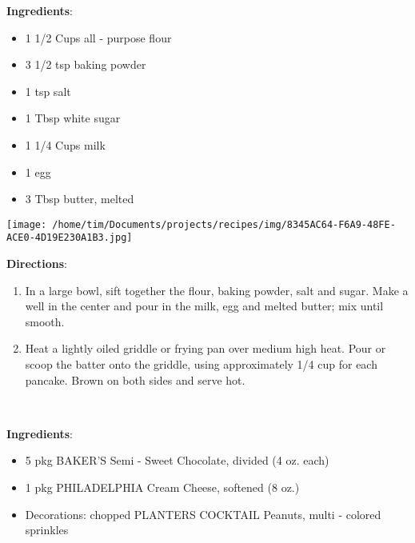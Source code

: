\documentclass[11pt, twoside, openany]{book}
\begin{document}
\begin{minipage}[t]{0.8\linewidth}
\textbf{Ingredients}:\vspace{-3mm}
\begin{multicols}{2}
\begin{itemize}\setlength\itemsep{-1mm}
\item 1 1/2 Cups all - purpose flour
\item 3 1/2 tsp baking powder
\item 1 tsp salt
\item 1 Tbsp white sugar
\item 1 1/4 Cups milk
\item 1 egg
\item 3 Tbsp butter, melted
\end{itemize}
\end{multicols}
\end{minipage}
\begin{minipage}[t]{0.2\linewidth}
\centering \strut\vspace*{-\baselineskip}\newline
\texttt{[image: /home/tim/Documents/projects/recipes/img/8345AC64-F6A9-48FE-ACE0-4D19E230A1B3.jpg]}\\
\end{minipage}\vspace{3mm}
\textbf{Directions}:
\vspace{-3mm}\begin{enumerate}\setlength\itemsep{-1mm}
\item In a large bowl, sift together the flour, baking powder, salt and sugar. Make a well in the center and pour in the milk, egg and melted butter; mix until smooth.
\item Heat a lightly oiled griddle or frying pan over medium high heat. Pour or scoop the batter onto the griddle, using approximately 1/4 cup for each pancake. Brown on both sides and serve hot.
\end{enumerate}
 \label{simply-sensational-truffles}\hfill\textit{}\\
\begin{minipage}[t]{0.8\linewidth}
\textbf{Ingredients}:\vspace{-3mm}
\begin{multicols}{2}
\begin{itemize}\setlength\itemsep{-1mm}
\item 5 pkg BAKER'S Semi - Sweet Chocolate, divided (4 oz. each)
\item 1 pkg PHILADELPHIA Cream Cheese, softened (8 oz.)
\item Decorations: chopped PLANTERS COCKTAIL Peanuts, multi - colored sprinkles
\end{itemize}
\end{multicols}
\end{minipage}
\end{document}

